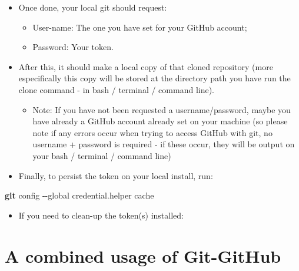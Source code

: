 \documentclass[
]{book}
\newenvironment{Shaded}{\begin{snugshade}}{\end{snugshade}}
\newcommand{\AttributeTok}[1]{\textcolor[rgb]{0.13,0.29,0.53}{#1}}
\newcommand{\ExtensionTok}[1]{#1}
\newcommand{\FunctionTok}[1]{\textcolor[rgb]{0.13,0.29,0.53}{\textbf{#1}}}
\newcommand{\NormalTok}[1]{#1}
\providecommand{\tightlist}{%
  \setlength{\itemsep}{0pt}\setlength{\parskip}{0pt}}
\begin{document}
\begin{itemize}
\tightlist
\item
  Once done, your local git should request:

  \begin{itemize}
  \tightlist
  \item
    User-name: The one you have set for your GitHub account;
  \item
    Password: Your token.
  \end{itemize}
\item
  After this, it should make a local copy of that cloned repository (more
  especifically this copy will be stored at the directory path you have run the
  clone command - in bash / terminal / command line).

  \begin{itemize}
  \tightlist
  \item
    Note: If you have not been requested a username/password, maybe you have already
    a GitHub account already set on your machine (so please note if any errors occur
    when trying to access GitHub with git, no username + password is required -
    if these occur, they will be output on your bash / terminal / command line)
  \end{itemize}
\item
  Finally, to persist the token on your local install, run:
\end{itemize}

\begin{Shaded}
\begin{Highlighting}[]
\FunctionTok{git}\NormalTok{ config }\AttributeTok{{-}{-}global}\NormalTok{ credential.helper cache}
\end{Highlighting}
\end{Shaded}

\begin{itemize}
\tightlist
\item
  If you need to clean-up the token(s) installed:
\end{itemize}

\begin{Shaded}
\end{Shaded}

\hypertarget{a-combined-usage-of-git-github}{%
\section{A combined usage of Git-GitHub}\label{a-combined-usage-of-git-github}}
\end{document}
